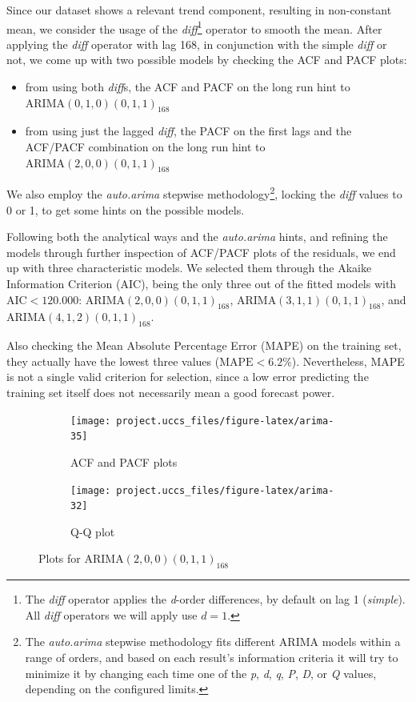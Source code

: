 \documentclass[12pt]{article}
\begin{document}
Since our dataset shows a relevant trend component, resulting in non-constant mean, we consider the usage of the \textit{diff}\footnote{The \textit{diff} operator applies the \textit{d}-order differences, by default on lag 1 (\textit{simple}). All \textit{diff} operators we will apply use $d=1$.} operator to smooth the mean.
After applying the \textit{diff} operator with lag 168, in conjunction with the simple \textit{diff} or not, we come up with two possible models by checking the ACF and PACF plots:
\begin{itemize}[topsep=0.5em,itemsep=0em,partopsep=0.5em]
	\item from using both \textit{diff}s, the ACF and PACF on the long run hint to $\mathrm{ARIMA}(0,1,0)(0,1,1)_{168}$
	\item from using just the lagged \textit{diff}, the PACF on the first lags and the ACF/PACF combination on the long run hint to $\mathrm{ARIMA}(2,0,0)(0,1,1)_{168}$
\end{itemize}
We also employ the \textit{auto.arima} stepwise methodology\footnote{The \textit{auto.arima} stepwise methodology fits different ARIMA models within a range of orders, and based on each result's information criteria it will try to minimize it by changing each time one of the \textit{p}, \textit{d}, \textit{q}, \textit{P}, \textit{D}, or \textit{Q} values, depending on the configured limits.}, locking the \textit{diff} values to 0 or 1, to get some hints on the possible models.

Following both the analytical ways and the \textit{auto.arima} hints, and refining the models through further inspection of ACF/PACF plots of the residuals, we end up with three characteristic models. We selected them through the Akaike Information Criterion (AIC), being the only three out of the fitted models with $\mathrm{AIC} < 120.000$: $\mathrm{ARIMA}(2,0,0)(0,1,1)_{168}$, $\mathrm{ARIMA}(3,1,1)(0,1,1)_{168}$, and $\mathrm{ARIMA}(4,1,2)(0,1,1)_{168}$.

Also checking the Mean Absolute Percentage Error (MAPE) on the training set, they actually have the lowest three values ($\mathrm{MAPE} < 6.2\%$). Nevertheless, MAPE is not a single valid criterion for selection, since a low error predicting the training set itself does not necessarily mean a good forecast power.

\begin{figure}[h]
	\begin{subfigure}{.5\linewidth}
		\texttt{[image: project.uccs\_files/figure-latex/arima-35]}
		\caption{ACF and PACF plots}
		\label{fig:arima-26}
	\end{subfigure}
	\begin{subfigure}{.5\linewidth}
		\texttt{[image: project.uccs\_files/figure-latex/arima-32]}
		\caption{Q-Q plot}
		\label{fig:arima-24}
	\end{subfigure}
	\begin{center}
		\caption{Plots for $\mathrm{ARIMA}(2,0,0)(0,1,1)_{168}$}
		\label{fig:arima}
	\end{center}
\end{figure}
\end{document}
